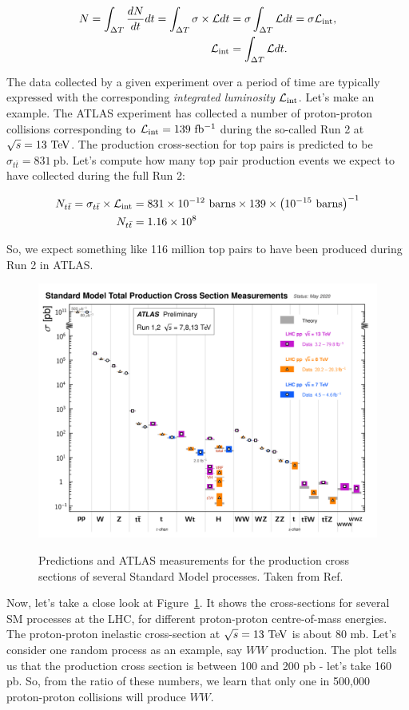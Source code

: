 \begin{align}
N = \int_{\Delta T} \frac{dN}{dt} dt = \int_{\Delta T} \sigma \times \mathcal{L} dt &= \sigma \int_{\Delta T} \mathcal{L} dt = \sigma \mathcal{L}_{\mathrm{int}}, \\ 
\mathcal{L}_{\mathrm{int}} &= \int_{\Delta T} \mathcal{L} dt.
\end{align}

The data collected by a given experiment over a period of time are typically expressed with the corresponding \textit{integrated luminosity} $\mathcal{L}_{\mathrm{int}}$. Let's make an example. The ATLAS experiment has collected a number of proton-proton collisions corresponding to $\Lint = 139\ \ifb$ during the so-called Run 2 at $\sqrt{s} = 13\ \TeV$. The production cross-section for top pairs is predicted to be $\sigma_{t\bar{t}} = 831\ \mathrm{pb}$. Let's compute how many top pair production events we expect to have collected during the full Run 2: 

\begin{align*}
N_{t\bar{t}} = \sigma_{t\bar{t}} \times \Lint &= 831 \times 10^{-12} \ \mathrm{barns} \times 139 \times \left(10^{-15}\ \mathrm{barns}\right)^{-1} \\
N_{t\bar{t}} &= 1.16\times 10^{8}
\end{align*}

So, we expect something like 116 million top pairs to have been produced during Run 2 in ATLAS. 

\begin{figure}[tb] 
	\centering
	\includegraphics[width=0.7\columnwidth]{Figures/SM_summary.png}
	\label{fig:SM_summary}
	\caption{Predictions and ATLAS measurements for the production cross sections of several Standard Model processes. Taken from Ref.~\cite{SM_summary}}
\end{figure}

Now, let's take a close look at Figure~\ref{fig:SM_summary}. It shows the cross-sections for several SM processes at the LHC, for different proton-proton centre-of-mass energies. The proton-proton inelastic cross-section at $\sqrt{s} = 13\ \TeV$ is about $80$ mb. Let's consider one random process as an example, say $WW$ production. The plot tells us that the production cross section is between 100 and 200 pb - let's take 160 pb. So, from the ratio of these numbers, we learn that only one in 500,000 proton-proton collisions will produce $WW$. 

